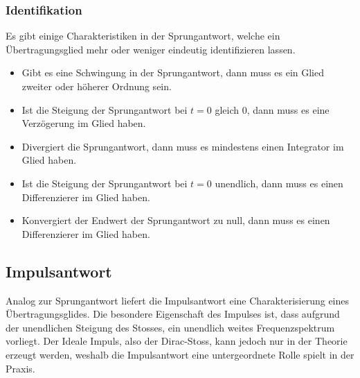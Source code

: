 \subsubsection{Identifikation}
Es gibt einige Charakteristiken in der Sprungantwort, welche ein
Übertragungsglied mehr oder weniger eindeutig identifizieren lassen.

\begin{itemize}
    \item Gibt es eine Schwingung in der Sprungantwort, dann muss es 
        ein Glied zweiter oder höherer Ordnung sein.
    \item Ist die Steigung der Sprungantwort bei $t=0$ gleich $0$, dann
        muss es eine Verzögerung im Glied haben.
    \item Divergiert die Sprungantwort, dann muss es mindestens einen
        Integrator im Glied haben. 
    \item Ist die Steigung der Sprungantwort bei $t=0$ unendlich, dann
        muss es einen Differenzierer im Glied haben.
    \item Konvergiert der Endwert der Sprungantwort zu null, dann muss
        es einen Differenzierer im Glied haben.
\end{itemize}

\subsection{Impulsantwort}
Analog zur Sprungantwort liefert die Impulsantwort eine Charakterisierung
eines Übertragungsglides. Die besondere Eigenschaft des Impulses ist,
dass aufgrund der unendlichen Steigung des Stosses, ein unendlich weites
Frequenzspektrum vorliegt. Der Ideale Impuls, also der Dirac-Stoss, kann
jedoch nur in der Theorie erzeugt werden, weshalb die Impulsantwort
eine untergeordnete Rolle spielt in der Praxis.
%
\begin{figure}[h!]
    \centering
\end{figure}

